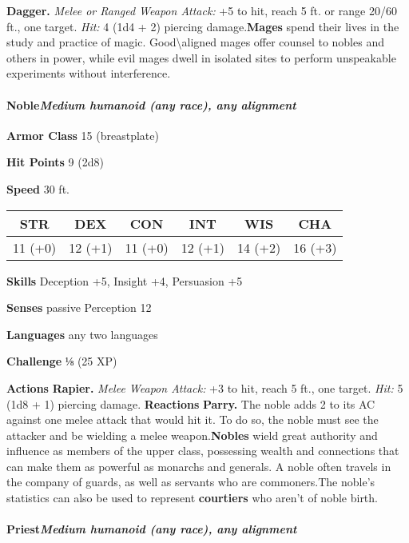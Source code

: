 \documentclass[
]{article}
\begin{document}
\textbf{Dagger.} \emph{Melee or Ranged Weapon Attack:} +5 to hit, reach
5 ft. or range 20/60 ft., one target. \emph{Hit:} 4 (1d4 + 2) piercing
damage.\textbf{Mages} spend their lives in the study and practice of
magic. Good\textbackslash aligned mages offer counsel to nobles and
others in power, while evil mages dwell in isolated sites to perform
unspeakable experiments without interference.

\hypertarget{noblemedium-humanoid-any-race-any-alignment}{%
\paragraph{\texorpdfstring{Noble\emph{Medium humanoid (any race), any
alignment}}{NobleMedium humanoid (any race), any alignment}}\label{noblemedium-humanoid-any-race-any-alignment}}

\textbf{Armor Class} 15 (breastplate)

\textbf{Hit Points} 9 (2d8)

\textbf{Speed} 30 ft.

\begin{longtable}[]{@{}cccccc@{}}
\toprule
STR & DEX & CON & INT & WIS & CHA\tabularnewline
\midrule
\endhead
11 (+0) & 12 (+1) & 11 (+0) & 12 (+1) & 14 (+2) & 16 (+3)\tabularnewline
\bottomrule
\end{longtable}

\textbf{Skills} Deception +5, Insight +4, Persuasion +5

\textbf{Senses} passive Perception 12

\textbf{Languages} any two languages

\textbf{Challenge} ⅛ (25 XP)

\textbf{Actions} \textbf{Rapier.} \emph{Melee Weapon Attack:} +3 to hit,
reach 5 ft., one target. \emph{Hit:} 5 (1d8 + 1) piercing damage.
\textbf{Reactions} \textbf{Parry.} The noble adds 2 to its AC against
one melee attack that would hit it. To do so, the noble must see the
attacker and be wielding a melee weapon.\textbf{Nobles} wield great
authority and influence as members of the upper class, possessing wealth
and connections that can make them as powerful as monarchs and generals.
A noble often travels in the company of guards, as well as servants who
are commoners.The noble's statistics can also be used to represent
\textbf{courtiers} who aren't of noble birth.

\hypertarget{priestmedium-humanoid-any-race-any-alignment}{%
\paragraph{\texorpdfstring{Priest\emph{Medium humanoid (any race), any
alignment}}{PriestMedium humanoid (any race), any alignment}}\label{priestmedium-humanoid-any-race-any-alignment}}
\end{document}
